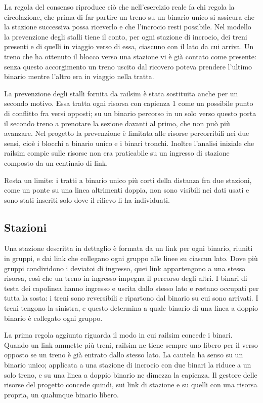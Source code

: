 La regola del consenso riproduce ciò che nell'esercizio reale fa chi regola la circolazione, che prima di far partire un treno su un binario unico si assicura che la stazione successiva possa riceverlo e che l'incrocio resti possibile. Nel modello la prevenzione degli stalli tiene il conto, per ogni stazione di incrocio, dei treni presenti e di quelli in viaggio verso di essa, ciascuno con il lato da cui arriva. Un treno che ha ottenuto il blocco verso una stazione vi è già contato come presente: senza questo accorgimento un treno uscito dal ricovero poteva prendere l'ultimo binario mentre l'altro era in viaggio nella tratta.

La prevenzione degli stalli fornita da railsim è stata sostituita anche per un secondo motivo. Essa tratta ogni risorsa con capienza 1 come un possibile punto di conflitto fra versi opposti; su un binario percorso in un solo verso questo porta il secondo treno a prenotare la sezione davanti al primo, che non può più avanzare. Nel progetto la prevenzione è limitata alle risorse percorribili nei due sensi, cioè i blocchi a binario unico e i binari tronchi. Inoltre l'analisi iniziale che railsim compie sulle risorse non era praticabile su un ingresso di stazione composto da un centinaio di link.

Resta un limite: i tratti a binario unico più corti della distanza fra due stazioni, come un ponte su una linea altrimenti doppia, non sono visibili nei dati usati e sono stati inseriti solo dove il rilievo li ha individuati.

\subsection{Stazioni}
Una stazione descritta in dettaglio è formata da un link per ogni binario, riuniti in gruppi, e dai link che collegano ogni gruppo alle linee su ciascun lato. Dove più gruppi condividono i deviatoi di ingresso, quei link appartengono a una stessa risorsa, così che un treno in ingresso impegna il percorso degli altri. I binari di testa dei capolinea hanno ingresso e uscita dallo stesso lato e restano occupati per tutta la sosta: i treni sono reversibili e ripartono dal binario su cui sono arrivati. I treni tengono la sinistra, e questo determina a quale binario di una linea a doppio binario è collegato ogni gruppo.

La prima regola aggiunta riguarda il modo in cui railsim concede i binari. Quando un link ammette più treni, railsim ne tiene sempre uno libero per il verso opposto se un treno è già entrato dallo stesso lato. La cautela ha senso su un binario unico; applicata a una stazione di incrocio con due binari la riduce a un solo treno, e su una linea a doppio binario ne dimezza la capienza. Il gestore delle risorse del progetto concede quindi, sui link di stazione e su quelli con una risorsa propria, un qualunque binario libero.

